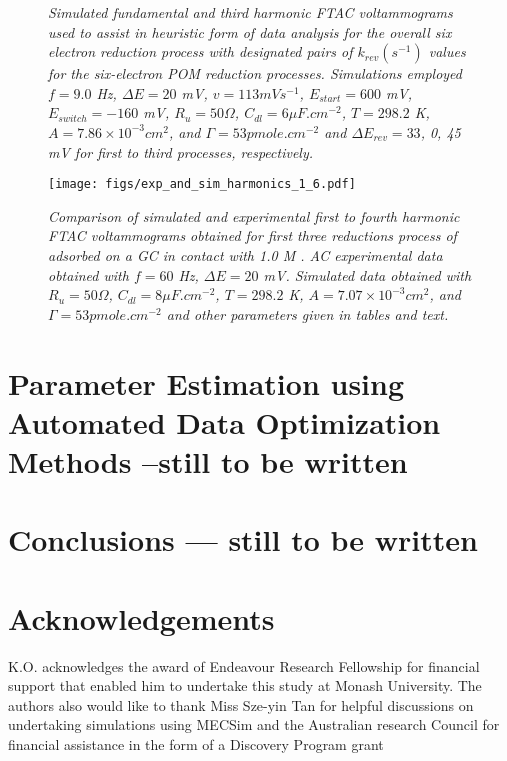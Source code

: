 \documentclass[a4paper, 12pt]{article}
\begin{document}
\begin{figure}[h]
    \caption{\it{Simulated fundamental and third harmonic FTAC voltammograms 
    used to assist in heuristic form of data analysis for the overall six 
    electron reduction process with designated pairs of $k_{rev} (s^{-1})$ 
    values for the six-electron POM reduction processes. Simulations employed $f 
    = 9.0$ Hz, $\Delta E = 20$ mV, $v = 113 mV s^{-1}$, $E_{start} = 600$ mV, 
    $E_{switch} = -160$ mV, $R_u = 50 \Omega$, $C_{dl} = 6 \mu F.cm^{-2}$, $T = 
    298.2$ K, $A = 7.86 \times 10^{-3} cm^2$, and $\Gamma = 53 pmole.cm^{-2}$ 
    and $\Delta E_{rev} = 33$, 0, 45 mV for first to third processes, 
    respectively.}}
    \label{fig:sim_for_heuristic_k}
\end{figure}

\begin{figure}[h]
\texttt{[image: figs/exp\_and\_sim\_harmonics\_1\_6.pdf]}
    \caption{\it{Comparison of simulated and experimental first to fourth 
    harmonic FTAC voltammograms obtained for first three reductions process of 
     adsorbed on a GC in contact with 1.0 M . AC 
    experimental data obtained with $f = 60$ Hz, $\Delta E = 20$ mV. Simulated 
    data obtained with $R_u = 50 \Omega$, $C_{dl} = 8 \mu F.cm^{-2}$, $T = 
    298.2$ K, $A = 7.07 \times 10^{-3} cm^2$, and $\Gamma = 53 pmole.cm^{-2}$ 
    and other parameters given in tables and text.}}
    \label{fig:sim_and_exp}
\end{figure}


\section{Parameter Estimation using Automated Data Optimization Methods --still 
to be written}

\section{Conclusions --- still to be written}

\section{Acknowledgements}

K.O. acknowledges the award of Endeavour Research Fellowship for financial support that enabled him to undertake this study at Monash University. The authors also would like to thank Miss Sze-yin Tan for helpful discussions on undertaking simulations using MECSim and the Australian research Council for financial assistance in the form of a Discovery Program grant



\end{document}
